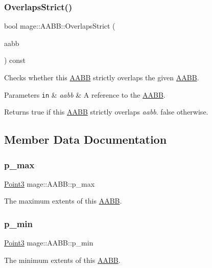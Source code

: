 \subsubsection{\texorpdfstring{Overlaps\+Strict()}{OverlapsStrict()}}
{\footnotesize\ttfamily bool mage\+::\+A\+A\+B\+B\+::\+Overlaps\+Strict (\begin{DoxyParamCaption}\item[{const \hyperlink{structmage_1_1_a_a_b_b}{A\+A\+BB} \&}]{aabb }\end{DoxyParamCaption}) const}

Checks whether this \hyperlink{structmage_1_1_a_a_b_b}{A\+A\+BB} strictly overlaps the given \hyperlink{structmage_1_1_a_a_b_b}{A\+A\+BB}.


\begin{DoxyParams}[1]{Parameters}
\mbox{\tt in}  & {\em aabb} & A reference to the \hyperlink{structmage_1_1_a_a_b_b}{A\+A\+BB}. \\
\hline
\end{DoxyParams}
\begin{DoxyReturn}{Returns}
{\ttfamily true} if this \hyperlink{structmage_1_1_a_a_b_b}{A\+A\+BB} strictly overlaps {\itshape aabb}. {\ttfamily false} otherwise. 
\end{DoxyReturn}


\subsection{Member Data Documentation}
\hypertarget{structmage_1_1_a_a_b_b_ad0a69206176c61ce9a71f2ddb0e5deb2}{}\label{structmage_1_1_a_a_b_b_ad0a69206176c61ce9a71f2ddb0e5deb2} 
\subsubsection{\texorpdfstring{p\+\_\+max}{p\_max}}
{\footnotesize\ttfamily \hyperlink{structmage_1_1_point3}{Point3} mage\+::\+A\+A\+B\+B\+::p\+\_\+max}

The maximum extents of this \hyperlink{structmage_1_1_a_a_b_b}{A\+A\+BB}. \hypertarget{structmage_1_1_a_a_b_b_a600c62081fd3516c0be64bb81495cd1d}{}\label{structmage_1_1_a_a_b_b_a600c62081fd3516c0be64bb81495cd1d} 
\subsubsection{\texorpdfstring{p\+\_\+min}{p\_min}}
{\footnotesize\ttfamily \hyperlink{structmage_1_1_point3}{Point3} mage\+::\+A\+A\+B\+B\+::p\+\_\+min}

The minimum extents of this \hyperlink{structmage_1_1_a_a_b_b}{A\+A\+BB}. 